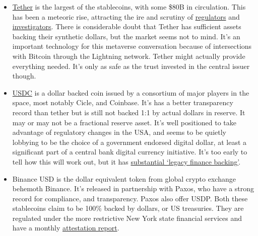 \begin{itemize}
\item \href{https://tether.to/en/whitepaper/}{Tether} is the largest of the stablecoins, with some \$80B in circulation. This has been a meteoric rise, attracting the ire and scrutiny of \href{https://www.cftc.gov/PressRoom/PressReleases/8450-21}{regulators} and \href{https://www.bloomberg.com/news/features/2021-10-07/crypto-mystery-where-s-the-69-billion-backing-the-stablecoin-tether}{investigators}. There is considerable doubt that Tether has sufficient assets backing their synthetic dollars, but the market seems not to mind. It's an important technology for this metaverse conversation because of intersections with Bitcoin through the Lightning network. Tether might actually provide everything needed. It's only as safe as the trust invested in the central issuer though.
\item \href{https://f.hubspotusercontent30.net/hubfs/9304636/PDF/centre-whitepaper.pdf}{USDC} is a dollar backed coin issued by a consortium of major players in the space, most notably Cicle, and Coinbase. It's has a better transparency record than tether but is still not backed 1:1 by actual dollars in reserve. It may or may not be a fractional reserve asset. It's  well positioned to take advantage of regulatory changes in the USA, and seems to be quietly lobbying to be the choice of a government endorsed digital dollar, at least a significant part of a central bank digital currency initiative. It's too early to tell how this will work out, but it has \href{https://www.forbes.com/sites/ninabambysheva/2022/04/13/blackrocks-newest-investment-paves-the-way-for-digital-assets-on-wall-street/?}{substantial `legacy finance backing'}.
\item Binance USD is the dollar equivalent token from global crypto exchange behemoth Binance. It's released in partnership with Paxos, who have a strong record for compliance, and transparency. Paxos also offer USDP. Both these stablecoins claim to be 100\% backed by dollars, or US treasuries. They are regulated under the more restrictive New York state financial services and have a monthly \href{https://paxos.com/attestations/}{attestation report}.

\end{itemize}
